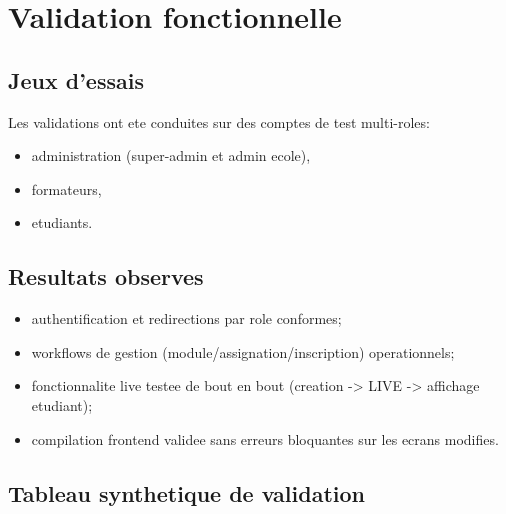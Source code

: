 ﻿\documentclass[12pt,a4paper,oneside]{report}
\begin{document}
\section{Validation fonctionnelle}

\subsection{Jeux d'essais}

Les validations ont ete conduites sur des comptes de test multi-roles:
\begin{itemize}
  \item administration (super-admin et admin ecole),
  \item formateurs,
  \item etudiants.
\end{itemize}

\subsection{Resultats observes}

\begin{itemize}
  \item authentification et redirections par role conformes;
  \item workflows de gestion (module/assignation/inscription) operationnels;
  \item fonctionnalite live testee de bout en bout (creation -> LIVE -> affichage etudiant);
  \item compilation frontend validee sans erreurs bloquantes sur les ecrans modifies.
\end{itemize}

\subsection{Tableau synthetique de validation}
\end{document}
